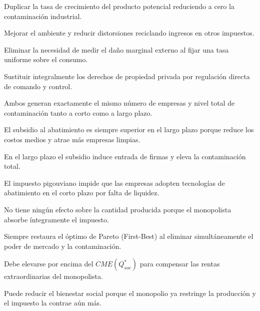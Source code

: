 \begin{opts}
    \item Duplicar la tasa de crecimiento del producto potencial reduciendo a cero la contaminación industrial.
    \item Mejorar el ambiente y reducir distorsiones reciclando ingresos en otros impuestos.
    \item Eliminar la necesidad de medir el daño marginal externo al fijar una tasa uniforme sobre el consumo.
    \item Sustituir integralmente los derechos de propiedad privada por regulación directa de comando y control.
\end{opts}

\begin{opts}
    \item Ambos generan exactamente el mismo número de empresas y nivel total de contaminación tanto a corto como a largo plazo.
    \item El subsidio al abatimiento es siempre superior en el largo plazo porque reduce los costos medios y atrae más empresas limpias.
    \item En el largo plazo el subsidio induce entrada de firmas y eleva la contaminación total.
    \item El impuesto pigouviano impide que las empresas adopten tecnologías de abatimiento en el corto plazo por falta de liquidez.
\end{opts}

\begin{opts}
    \item No tiene ningún efecto sobre la cantidad producida porque el monopolista absorbe íntegramente el impuesto.
    \item Siempre restaura el óptimo de Pareto (First-Best) al eliminar simultáneamente el poder de mercado y la contaminación.
    \item Debe elevarse por encima del $CME(Q_{soc}^*)$ para compensar las rentas extraordinarias del monopolista.
    \item Puede reducir el bienestar social porque el monopolio ya restringe la producción y el impuesto la contrae aún más.
\end{opts}

